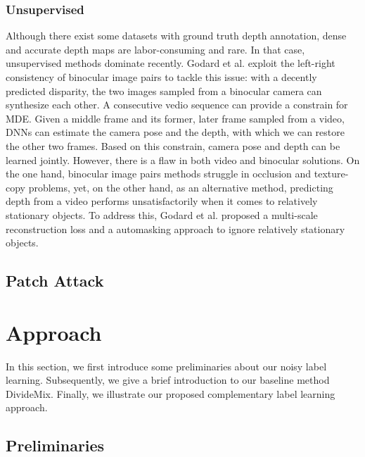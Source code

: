 \documentclass[10pt,twocolumn,letterpaper]{article}
\begin{document}
\subsubsection{Unsupervised}
Although there exist some datasets with ground truth depth 
annotation, dense and accurate depth maps are labor-consuming and rare. 
In that case, unsupervised methods dominate recently.
Godard et al. exploit the left-right consistency of binocular image pairs
to tackle this issue: 
with a decently predicted disparity, 
the two images sampled from a binocular camera can synthesize each other. 
A consecutive vedio sequence can provide a constrain for MDE.
Given a middle frame and its former, later frame sampled from a video, 
DNNs can estimate the camera pose and the depth, with which we can 
restore the other two frames. Based on this constrain, camera pose 
and depth can be learned jointly.
However, there is a flaw in both video and binocular solutions.
On the one hand, binocular image pairs methods struggle in occlusion 
and texture-copy problems, yet, on the other hand, as an alternative method, 
predicting depth from a video performs unsatisfactorily 
when it comes to relatively stationary objects.
To address this, Godard et al. proposed a multi-scale reconstruction
loss and a automasking approach to ignore relatively stationary objects.
\subsection{Patch Attack}


\section{Approach}
In this section, we first introduce some preliminaries about our noisy label learning. Subsequently, we give a brief introduction to our baseline method DivideMix\cite{li2020dividemix}. Finally, we illustrate our proposed complementary label learning approach.
\subsection{Preliminaries}
\end{document}
